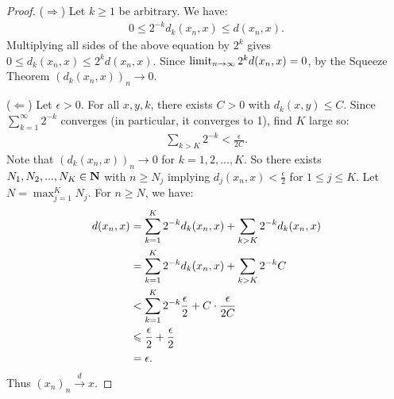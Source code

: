         \begin{proof}
            ($\Rightarrow$) Let $k \geq 1$ be arbitrary. We have:
                \begin{equation*}
                \begin{split}
                    0 \leq 2^{-k}d_k(x_n,x) \leq d(x_n,x).
                \end{split}
                \end{equation*}
            Multiplying all sides of the above equation by $2^k$ gives $0 \leq d_k(x_n,x) \leq 2^k d(x_n,x)$. Since $\limit_{n \rightarrow \infty}2^kd(x_n,x) = 0$, by the Squeeze Theorem $(d_k(x_n,x))_n \rightarrow 0$.

            ($\Leftarrow$) Let $\epsilon > 0$. For all $x,y,k$, there exists $C > 0$ with $d_k(x,y) \leq C$. Since $\sum_{k = 1}^\infty 2^{-k}$ converges (in particular, it converges to 1), find $K$ large so:
                \begin{equation*}
                \begin{split}
                    \sum_{k > K}2^{-k} < \frac{\epsilon}{2C}.
                \end{split}
                \end{equation*}
            Note that $(d_k(x_n,x))_n \rightarrow 0$ for $k = 1,2,...,K$. So there exists $N_1,N_2,...,N_K \in \bfN$ with $n \geq N_j$ implying $d_j(x_n,x)<\frac{\epsilon}{2}$ for $1 \leq j \leq K$. Let $N = \max_{j = 1}^K N_j$. For $n \geq N$, we have:
                \begin{equation*}
                \begin{split}
                    d(x_n,x) 
                    & = \sum_{k = 1}^K 2^{-k}d_k(x_n,x) + \sum_{k > K}2^{-k}d_k(x_n,x) \\
                    & = \sum_{k = 1}^K 2^{-k}d_k(x_n,x) + \sum_{k > K}2^{-k} C \\
                    & < \sum_{k = 1}^K 2^{-k} \frac{\epsilon}{2} + C \cdot \frac{\epsilon}{2C} \\
                    & \leq \frac{\epsilon}{2} + \frac{\epsilon}{2} \\
                    & = \epsilon. \qedhere
                \end{split}
                \end{equation*}
            Thus $(x_n)_n \xrightarrow{d} x$.
            \end{proof}

